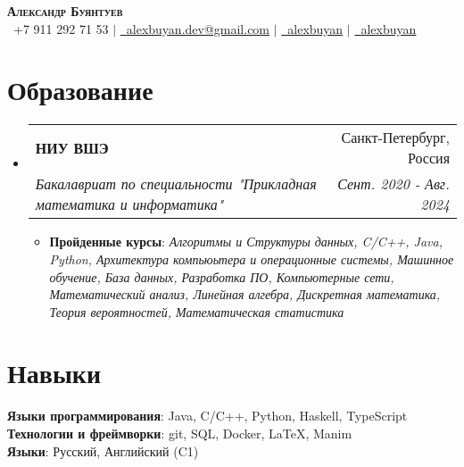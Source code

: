 \documentclass[english,russian,letterpaper,11pt]{article}
\makeatletter
\newcommand{\resumeItem}[1]{
  \item\small{
    {#1 \vspace{-2pt}}
  }
}
\newcommand{\resumeSubheading}[4]{
  \vspace{-2pt}\item
    \begin{tabular*}{0.97\textwidth}[t]{l@{\extracolsep{\fill}}r}
      \textbf{#1} & #2 \\
      \textit{\small#3} & \textit{\small #4} \\
    \end{tabular*}\vspace{-7pt}
}
\newcommand{\resumeSubHeadingListStart}{\begin{itemize}[leftmargin=0.15in, label={}]}
\newcommand{\resumeSubHeadingListEnd}{\end{itemize}}
\newcommand{\resumeItemListStart}{\begin{itemize}}
\newcommand{\resumeItemListEnd}{\end{itemize}\vspace{-5pt}}
\makeatother
\begin{document}

\begin{center}
    \textbf{\Huge \scshape Александр Буянтуев} \\ \vspace{2pt}
    \small \faPhone \ +7 911 292 71 53 $|$ \href{mailto:alexbuyan.dev@gmail.com}{\faEnvelope \ \underline{alexbuyan.dev@gmail.com}} $|$ 
    \href{https://github.com/alexbuyan}{\faGithub \ \underline{alexbuyan}} $|$ \href{https://www.linkedin.com/in/alexander-buyantuev-063785223}{\faLinkedin \ \underline{alexbuyan}}
\end{center}


\section{Образование}
  \resumeSubHeadingListStart
    \resumeSubheading
      {НИУ ВШЭ}{Санкт-Петербург, Россия}
      {Бакалавриат по специальности "Прикладная математика и информатика"}{Сент. 2020 - Авг. 2024}
      \resumeItemListStart
        \resumeItem{\textbf{Пройденные курсы}: \textit{Алгоритмы и Структуры данных, C/C++, Java, Python, Архитектура компьюьтера и операционные системы, Машинное обучение, База данных, Разработка ПО, Компьютерные сети, Математический анализ, Линейная алгебра, Дискретная математика, Теория вероятностей, Математическая статистика}}
      \resumeItemListEnd
  \resumeSubHeadingListEnd

\section{Навыки}
 \begin{itemize}[leftmargin=0.15in, label={}]
    \small{\item{
     \textbf{Языки программирования}{: Java, C/C++, Python, Haskell, TypeScript} \\
     \textbf{Технологии и фреймворки}{: git, SQL, Docker, \LaTeX, Manim} \\
     \textbf{Языки}{: Русский, Английский (C1)} \\
    }}
 \end{itemize}
\end{document}
